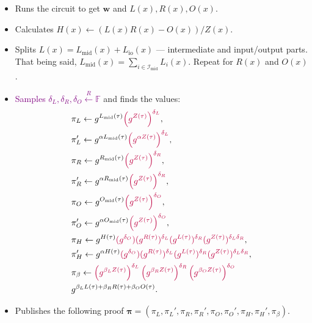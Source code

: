 \documentclass[../lecture-notes.tex]{subfiles}
\begin{document}
\begin{tcolorbox}
    \begin{itemize}[label=, left=0.5em]
        \item Runs the circuit to get $\mathbf{w}$ and $L(x),R(x),O(x)$.
        \item Calculates $H(x) \gets (L(x)R(x) - O(x))\big/ Z(x)$.
        \item Splits $L(x) = L_{\text{mid}}(x) + L_{\text{io}}(x)$ --- intermediate and input/output parts. That being said, $L_{\text{mid}}(x) = \sum_{i \in \mathcal{I}_{\text{mid}}}L_i(x)$. Repeat for $R(x)$ and $O(x)$.
        \item \textcolor{purple}{Samples $\delta_L, \delta_R, \delta_O \xleftarrow{R} \mathbb{F}$} and finds the values: 
        \begin{equation*}
            \begin{aligned}
                &\pi_L \gets g^{L_{\text{mid}}(\tau)}\textcolor{purple}{\left(g^{Z(\tau)}\right)^{\delta_L}}, \\ & \pi_L' \gets g^{\alpha L_{\text{mid}}(\tau)}\textcolor{purple}{\left(g^{\alpha Z(\tau)}\right)^{\delta_L}}, \\
                &\pi_R \gets g^{R_{\text{mid}}(\tau)}\textcolor{purple}{\left(g^{Z(\tau)}\right)^{\delta_R}}, \\ & \pi_R' \gets g^{\alpha R_{\text{mid}}(\tau)}\textcolor{purple}{\left(g^{Z(\tau)}\right)^{\delta_R}}, \\
                &\pi_O \gets g^{O_{\text{mid}}(\tau)}\textcolor{purple}{\left(g^{Z(\tau)}\right)^{\delta_O}}, \\ & \pi_O' \gets g^{\alpha O_{\text{mid}}(\tau)}\textcolor{purple}{\left(g^{Z(\tau)}\right)^{\delta_O}}, \\
                &\pi_H \gets g^{H(\tau)}\textcolor{purple}{(g^{\delta_O})(g^{R(\tau)})^{\delta_L}(g^{L(\tau)})^{\delta_R}(g^{Z(\tau)})^{\delta_L\delta_R}}, \\ 
                &\pi_H' \gets g^{\alpha H(\tau)}\textcolor{purple}{(g^{\delta_O})(g^{R(\tau)})^{\delta_L}(g^{L(\tau)})^{\delta_R}(g^{Z(\tau)})^{\delta_L\delta_R}}, \\
                &\pi_{\beta} \gets \textcolor{purple}{\left(g^{\beta_L Z(\tau)}\right)^{\delta_L}\left(g^{\beta_R Z(\tau)}\right)^{\delta_R}\left(g^{\beta_O Z(\tau)}\right)^{\delta_O}} \\ & g^{\beta_LL(\tau) + \beta_RR(\tau) + \beta_OO(\tau)}.
            \end{aligned}
        \end{equation*}
        \item Publishes the following proof $\boldsymbol{\pi} = (\pi_L,\pi_L',\pi_R,\pi_R',\pi_O,\pi_O',\pi_H,\pi_H',\pi_{\beta})$.
    \end{itemize}


\end{tcolorbox}
\end{document}
